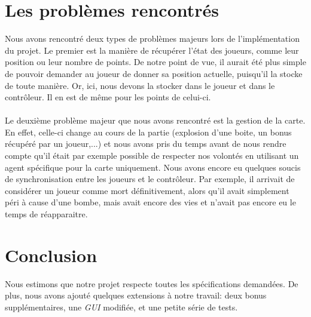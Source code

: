 \documentclass{article}
\begin{document}
\section{Les problèmes rencontrés}
Nous avons rencontré deux types de problèmes majeurs lors de l'implémentation du projet. Le premier est la manière de récupérer l'état des joueurs, comme leur position ou leur nombre de points. De notre point de vue, il aurait été plus simple de pouvoir demander au joueur de donner sa position actuelle, puisqu'il la stocke de toute manière. Or, ici, nous devons la stocker dans le joueur et dans le contrôleur. Il en est de même pour les points de celui-ci. \\ \\
Le deuxième problème majeur que nous avons rencontré est la gestion de la carte. En effet, celle-ci change au cours de la partie (explosion d'une boite, un bonus récupéré par un joueur,...) et nous avons pris du temps avant de nous rendre compte qu'il était par exemple possible de respecter nos volontés en utilisant un agent spécifique pour la carte uniquement. Nous avons encore eu quelques soucis de synchronisation entre les joueurs et le contrôleur. Par exemple, il arrivait de considérer un joueur comme mort définitivement, alors qu'il avait simplement péri à cause d'une bombe, mais avait encore des vies et n'avait pas encore eu le temps de réapparaitre.

\section{Conclusion}
Nous estimons que notre projet respecte toutes les spécifications demandées. De plus, nous avons ajouté quelques extensions à notre travail: deux bonus supplémentaires, une \emph{GUI} modifiée, et une petite série de tests. 
\end{document}

